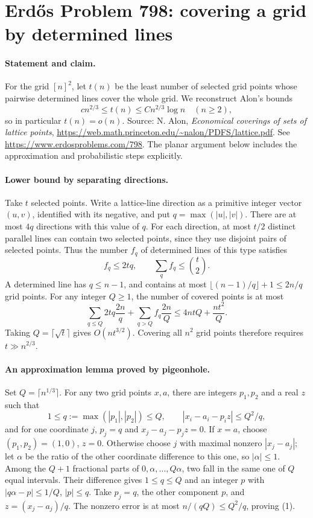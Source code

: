 \section*{Erd\H{o}s Problem 798: covering a grid by determined lines}

\paragraph{Statement and claim.}
For the grid \([n]^2\), let \(t(n)\) be the least number of
selected grid points whose pairwise determined lines cover
the whole grid. We reconstruct Alon's bounds
\[
 c n^{2/3}\leq t(n)\leq C n^{2/3}\log n
 \quad(n\geq2),
\]
so in particular \(t(n)=o(n)\).
Source: N. Alon, \emph{Economical coverings of sets of lattice
points}, \url{https://web.math.princeton.edu/~nalon/PDFS/lattice.pdf}.
See \url{https://www.erdosproblems.com/798}.
The planar argument below includes the approximation and
probabilistic steps explicitly.

\paragraph{Lower bound by separating directions.}
Take \(t\) selected points. Write a lattice-line direction
as a primitive integer vector \((u,v)\), identified with its
negative, and put \(q=\max(|u|,|v|)\).
There are at most \(4q\) directions with this value of \(q\).
For each direction, at most \(t/2\) distinct parallel lines
can contain two selected points, since they use disjoint
pairs of selected points.
Thus the number \(f_q\) of determined lines of this type
satisfies
\[
 f_q\leq2tq,\qquad \sum_qf_q\leq\binom t2.
\]
A determined line has \(q\leq n-1\), and contains at most
\(\lfloor(n-1)/q\rfloor+1\leq2n/q\) grid points.
For any integer \(Q\geq1\), the number of covered points is
at most
\[
 \sum_{q\leq Q}2tq\frac{2n}{q}
 +\sum_{q>Q}f_q\frac{2n}{Q}
 \leq4ntQ+\frac{nt^2}{Q}.
\]
Taking \(Q=\lceil\sqrt t\rceil\) gives \(O(nt^{3/2})\).
Covering all \(n^2\) grid points therefore requires
\(t\gg n^{2/3}\).

\paragraph{An approximation lemma proved by pigeonhole.}
Set \(Q=\lceil n^{1/3}\rceil\).
For any two grid points \(x,a\), there are integers \(p_1,p_2\)
and a real \(z\) such that
\[
 1\leq q:=\max(|p_1|,|p_2|)\leq Q,\qquad
 |x_i-a_i-p_i z|\leq Q^2/q,                                   \tag{1}
\]
and for one coordinate \(j\), \(p_j=q\) and
\(x_j-a_j-p_jz=0\).
If \(x=a\), choose \((p_1,p_2)=(1,0)\), \(z=0\).
Otherwise choose \(j\) with maximal nonzero \(|x_j-a_j|\);
let \(\alpha\) be the ratio of the other coordinate difference
to this one, so \(|\alpha|\leq1\).
Among the \(Q+1\) fractional parts of \(0,\alpha,\ldots,Q\alpha\),
two fall in the same one of \(Q\) equal intervals.
Their difference gives \(1\leq q\leq Q\) and an integer \(p\)
with \(|q\alpha-p|\leq1/Q\), \(|p|\leq q\).
Take \(p_j=q\), the other component \(p\), and
\(z=(x_j-a_j)/q\). The nonzero error is at most
\(n/(qQ)\leq Q^2/q\), proving (1).

